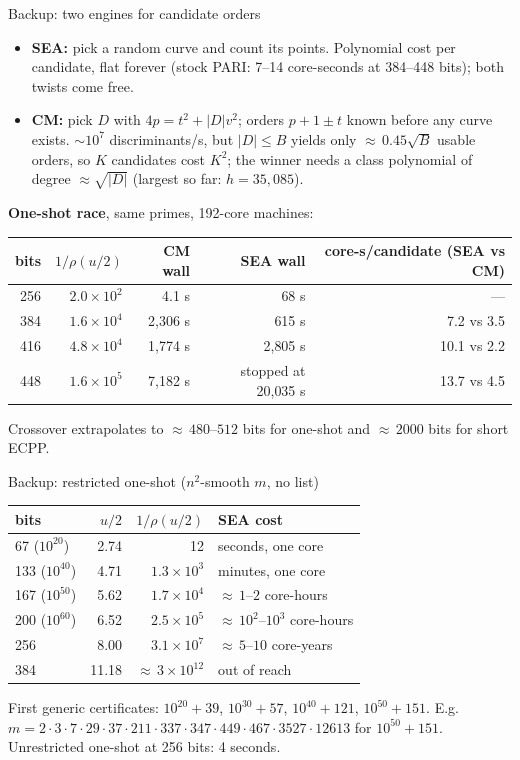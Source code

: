 \documentclass[aspectratio=169,11pt]{beamer}
\begin{document}
\begin{frame}{Backup: two engines for candidate orders}
\begin{itemize}
\item \textbf{SEA:} pick a random curve and count its points.  Polynomial cost per candidate,
flat forever (stock PARI: 7--14 core-seconds at 384--448 bits); both twists come free.
\item \textbf{CM:} pick $D$ with $4p = t^2 + |D|v^2$; orders $p+1\pm t$ known before any curve
exists.  ${\sim}10^7$ discriminants/s, but $|D|\le B$ yields only ${\approx}\,0.45\sqrt B$ usable
orders, so $K$ candidates cost $K^2$; the winner needs a class polynomial of degree
${\approx}\sqrt{|D|}$ (largest so far: $h = 35{,}085$).
\end{itemize}
\medskip
\textbf{One-shot race}, same primes, 192-core machines:
\begin{center}\small
\begin{tabular}{@{}rrrrr@{}}
\toprule
bits & $1/\rho(u/2)$ & CM wall & SEA wall & core-s/candidate (SEA vs CM)\\
\midrule
256 & $2.0\times10^2$ & 4.1 s & 68 s & ---\\
384 & $1.6\times10^4$ & 2{,}306 s & 615 s & 7.2 vs 3.5\\
416 & $4.8\times10^4$ & 1{,}774 s & 2{,}805 s & 10.1 vs 2.2\\
448 & $1.6\times10^5$ & 7{,}182 s & stopped at 20{,}035 s & 13.7 vs 4.5\\
\bottomrule
\end{tabular}
\end{center}
Crossover extrapolates to ${\approx}\,480$--$512$ bits for one-shot and ${\approx}\,2000$ bits for
short ECPP.
\end{frame}

\begin{frame}{Backup: restricted one-shot ($n^2$-smooth $m$, no list)}
\centering\small
\begin{tabular}{@{}lrrl@{}}
\toprule
bits & $u/2$ & $1/\rho(u/2)$ & SEA cost\\
\midrule
67 ($10^{20}$) & 2.74 & 12 & seconds, one core\\
133 ($10^{40}$) & 4.71 & $1.3\times10^3$ & minutes, one core\\
167 ($10^{50}$) & 5.62 & $1.7\times10^4$ & ${\approx}\,1$--$2$ core-hours\\
200 ($10^{60}$) & 6.52 & $2.5\times10^5$ & ${\approx}\,10^2$--$10^3$ core-hours\\
256 & 8.00 & $3.1\times10^7$ & ${\approx}\,5$--$10$ core-years\\
384 & 11.18 & ${\approx}\,3\times10^{12}$ & out of reach\\
\bottomrule
\end{tabular}

\bigskip
\raggedright
First generic certificates: $10^{20}+39$, $10^{30}+57$, $10^{40}+121$, $10^{50}+151$.  E.g.\
$m = 2\cdot3\cdot7\cdot29\cdot37\cdot211\cdot337\cdot347\cdot449\cdot467\cdot3527\cdot12613$ for
$10^{50}+151$.\\[4pt]
Unrestricted one-shot at 256 bits: 4 seconds.
\end{frame}
\end{document}
